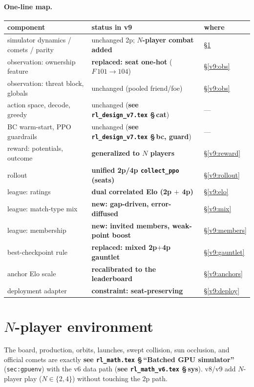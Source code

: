 \documentclass[11pt]{article}
\newcommand{\cd}[1]{\texttt{#1}}
\newcommand{\rlref}[2]{\textbf{see \texttt{rl\_math.tex} \S\,``#1''} (\texttt{#2})}
\newcommand{\vsixref}[1]{\textbf{see \texttt{rl\_math\_v6.tex} \S\,#1}}
\newcommand{\vsevenref}[1]{\textbf{see \texttt{rl\_design\_v7.tex} \S\,#1}}
\begin{document}
\paragraph{One-line map.}
\begin{center}
\small
\begin{tabular}{@{}lll@{}}
\toprule
component & status in v9 & where \\
\midrule
simulator dynamics / comets / parity & unchanged 2p; \textbf{$N$-player combat added} & \S\ref{v9:env} \\
observation: ownership feature       & \textbf{replaced: seat one-hot} ($F\,101\!\to\!104$) & \S\ref{v9:obs} \\
observation: threat block, globals   & unchanged (pooled friend/foe)     & \S\ref{v9:obs} \\
action space, decode, greedy         & unchanged (\vsevenref{cat})       & --- \\
BC warm-start, PPO guardrails        & unchanged (\vsevenref{bc, guard}) & --- \\
reward: potentials, outcome          & \textbf{generalized to $N$ players} & \S\ref{v9:reward} \\
rollout                              & \textbf{unified 2p/4p \cd{collect\_ppo} (seats)} & \S\ref{v9:rollout} \\
league: ratings                      & \textbf{dual correlated Elo (2p $+$ 4p)} & \S\ref{v9:elo} \\
league: match-type mix               & \textbf{new: gap-driven, error-diffused} & \S\ref{v9:mix} \\
league: membership                   & \textbf{new: invited members, weak-point boost} & \S\ref{v9:members} \\
best-checkpoint rule                 & \textbf{replaced: mixed 2p$+$4p gauntlet} & \S\ref{v9:gauntlet} \\
anchor Elo scale                     & \textbf{recalibrated to the leaderboard} & \S\ref{v9:anchors} \\
deployment adapter                   & \textbf{constraint: seat-preserving} & \S\ref{v9:deploy} \\
\bottomrule
\end{tabular}
\end{center}

\section{$N$-player environment}\label{v9:env}
The board, production, orbits, launches, swept collision, sun occlusion, and official comets are
exactly \rlref{Batched GPU simulator}{sec:gpuenv} with the v6 data path (\vsixref{sys}). v8/v9 add
$N$-player play ($N\in\{2,4\}$) without touching the 2p path.
\end{document}
